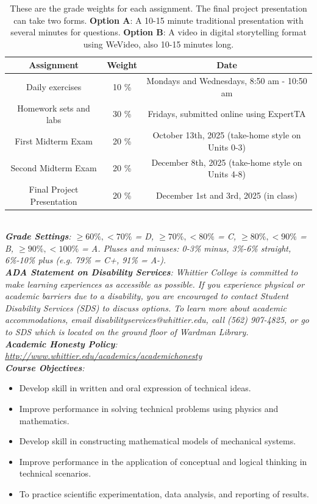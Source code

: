 \documentclass[10pt]{article}
\begin{document}
\begin{table}
\centering
\begin{tabular}{| c | c | c |}
\hline
\textbf{Assignment} & \textbf{Weight} & \textbf{Date} \\ \hline
Daily exercises & 10 \% & Mondays and Wednesdays, 8:50 am - 10:50 am\\ \hline
Homework sets and labs & 30 \% & Fridays, submitted online using ExpertTA \\ \hline
First Midterm Exam & 20 \% & October 13th, 2025 (take-home style on Units 0-3) \\ \hline
Second Midterm Exam & 20 \% & December 8th, 2025 (take-home style on Units 4-8) \\ \hline
Final Project Presentation & 20 \% & December 1st and 3rd, 2025 (in class) \\ \hline
\end{tabular}
\caption{\label{tab:grading} These are the grade weights for each assignment. The final project presentation can take two forms.  \textbf{Option A}: A 10-15 minute traditional presentation with several minutes for questions.  \textbf{Option B}: A video in digital storytelling format using WeVideo, also 10-15 minutes long.}
\end{table} \\
\noindent
\textit{\textbf{Grade Settings}: $\geq 60\%, <70\%$ = D, $\geq 70\%, <80\%$ = C, $\geq 80\%, <90\%$ = B, $\geq 90\%, <100\%$ = A. Pluses and minuses: 0-3\% minus, 3\%-6\% straight, 6\%-10\% plus (e.g. 79\% = C+, 91\% = A-).} \\
\textit{\textbf{ADA Statement on Disability Services}: Whittier College is committed to make learning experiences as accessible as possible. If you experience physical or academic barriers due to a disability, you are encouraged to contact Student Disability Services (SDS) to discuss options. To learn more about academic accommodations, email disabilityservices@whittier.edu, call (562) 907-4825, or go to SDS which is located on the ground floor of Wardman Library.} \\
\textit{\textbf{Academic Honesty Policy}: \url{http://www.whittier.edu/academics/academichonesty}} \\
\noindent
\textit{\textbf{Course Objectives}:}
\begin{itemize}
\item Develop skill in written and oral expression of technical ideas.
\item Improve performance in solving technical problems using physics and mathematics.
\item Develop skill in constructing mathematical models of mechanical systems.
\item Improve performance in the application of conceptual and logical thinking in technical scenarios.
\item To practice scientific experimentation, data analysis, and reporting of results.
\end{itemize}
\end{document}
